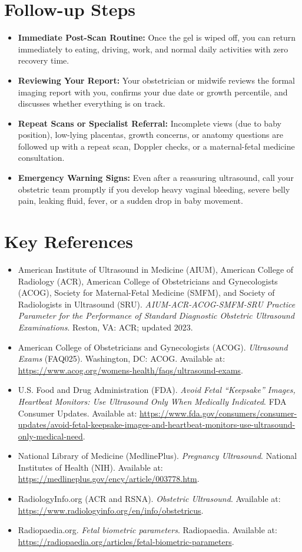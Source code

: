 \section{Follow-up Steps}
\begin{itemize}
\item \textbf{Immediate Post-Scan Routine:} Once the gel is wiped off, you can return immediately to eating, driving, work, and normal daily activities with zero recovery time.
\item \textbf{Reviewing Your Report:} Your obstetrician or midwife reviews the formal imaging report with you, confirms your due date or growth percentile, and discusses whether everything is on track.
\item \textbf{Repeat Scans or Specialist Referral:} Incomplete views (due to baby position), low-lying placentas, growth concerns, or anatomy questions are followed up with a repeat scan, Doppler checks, or a maternal-fetal medicine consultation.
\item \textbf{Emergency Warning Signs:} Even after a reassuring ultrasound, call your obstetric team promptly if you develop heavy vaginal bleeding, severe belly pain, leaking fluid, fever, or a sudden drop in baby movement.
\end{itemize}

\section{Key References}
\begin{itemize}
\item American Institute of Ultrasound in Medicine (AIUM), American College of Radiology (ACR), American College of Obstetricians and Gynecologists (ACOG), Society for Maternal-Fetal Medicine (SMFM), and Society of Radiologists in Ultrasound (SRU). \textit{AIUM-ACR-ACOG-SMFM-SRU Practice Parameter for the Performance of Standard Diagnostic Obstetric Ultrasound Examinations}. Reston, VA: ACR; updated 2023.
\item American College of Obstetricians and Gynecologists (ACOG). \textit{Ultrasound Exams} (FAQ025). Washington, DC: ACOG. Available at: \url{https://www.acog.org/womens-health/faqs/ultrasound-exams}.
\item U.S. Food and Drug Administration (FDA). \textit{Avoid Fetal ``Keepsake'' Images, Heartbeat Monitors: Use Ultrasound Only When Medically Indicated}. FDA Consumer Updates. Available at: \url{https://www.fda.gov/consumers/consumer-updates/avoid-fetal-keepsake-images-and-heartbeat-monitors-use-ultrasound-only-medical-need}.
\item National Library of Medicine (MedlinePlus). \textit{Pregnancy Ultrasound}. National Institutes of Health (NIH). Available at: \url{https://medlineplus.gov/ency/article/003778.htm}.
\item RadiologyInfo.org (ACR and RSNA). \textit{Obstetric Ultrasound}. Available at: \url{https://www.radiologyinfo.org/en/info/obstetricus}.
\item Radiopaedia.org. \textit{Fetal biometric parameters}. Radiopaedia. Available at: \url{https://radiopaedia.org/articles/fetal-biometric-parameters}.
\end{itemize}

